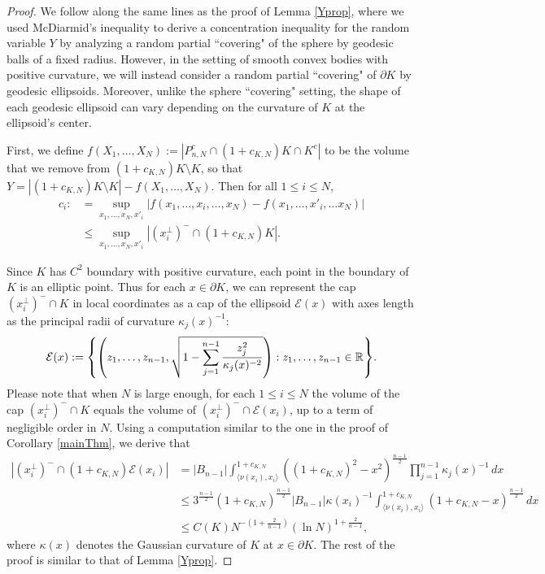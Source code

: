 \begin{proof}%
	
	We follow along the same lines as the proof of Lemma \ref{Yprop}, where we used McDiarmid's inequality to derive a concentration inequality for the random variable $Y$ by analyzing a random partial ``covering" of the sphere by geodesic balls of a fixed radius. However, in the setting of smooth convex bodies with positive curvature, we will instead consider a random partial ``covering" of $\partial K$ by geodesic ellipsoids. Moreover, unlike the sphere ``covering" setting, the  shape of each geodesic ellipsoid can vary depending on the curvature of $K$ at the ellipsoid's center.
	
	\vspace{1mm}
	
	First, we define $ f(X_1,\dots,X_N):=|P_{n,N}^c\cap(1+c_{K,N})K\cap K^c| $ to be the volume that we remove from $ (1+c_{K,N})K \setminus K $, so that $Y=|(1+c_{K,N})K\setminus K| - f(X_1,\ldots,X_N)$. Then for all $1\leq i\leq N$,
	\begin{align*}
	c_i:&=\sup_{x_1,\ldots,x_N,x'_i}|f(x_1,\ldots,x_i,\ldots ,x_N) - f(x_1,\ldots,x'_i,\ldots x_N)| \\
	&\leq \sup_{x_1,\ldots,x_N,x'_i} |(x_i^\perp)^{-}\cap (1+c_{K,N})K|.
	\end{align*}
	
	Since $K$ has $C^2$ boundary with  positive curvature, each point in the boundary of $K$ is an elliptic point. Thus for each $x\in\partial K$, we can represent the cap $(x_i^\perp)^{-} \cap  K$ in local coordinates as a cap of the ellipsoid  $\mathcal{E}(x)$ with axes length as the principal radii of curvature $\kappa_j(x)^{-1}$:
	\[
	\mathcal{E}(x):=\left\{\left(z_1,\ldots,z_{n-1},\sqrt{1 - \sum_{j=1}^{n-1}\frac{z^2_j}{\kappa_j(x)^{-2}}}\right): z_1,\ldots,z_{n-1}\in\R\right\}.
	\]Please note that when $N$ is large enough, for each $1\leq i\leq N$ the volume of the cap $(x_i^\perp)^{-} \cap  K$ equals the volume of  $(x_i^\perp)^{-}\cap \mathcal{E}(x_i)$, up to a term of negligible order in $N$. 
	Using a computation similar to the one in the proof of Corollary \ref{mainThm}, we derive that
	\begin{align}\label{ellipsoidcap}
	|(x_i^\perp)^{-}\cap (1+c_{K,N})\mathcal{E}(x_i)| &=|B_{n-1}|\int_{\langle\nu(x_i),x_i\rangle}^{1+c_{K,N}}\left((1+c_{K,N})^2-x^2\right)^{\frac{n-1}{2}}\prod_{j=1}^{n-1}\kappa_j(x)^{-1}\,dx \nonumber\\
	&\leq 3^{\frac{n-1}{2}}(1+c_{K,N})^{\frac{n-1}{2}}|B_{n-1}|\kappa(x_i)^{-1}\int_{\langle\nu(x_i),x_i\rangle}^{1+c_{K,N}}\left(1+c_{K,N}-x\right)^{\frac{n-1}{2}}\,dx \nonumber\\
	&\leq C(K)N^{-(1+\frac{2}{n-1})}(\ln N)^{1+\frac{2}{n-1}}, \nonumber
	\end{align}where $\kappa(x)$ denotes the Gaussian curvature of $K$ at $x\in\partial K$. The rest of the proof is similar to that of Lemma \ref{Yprop}. 
\end{proof}

